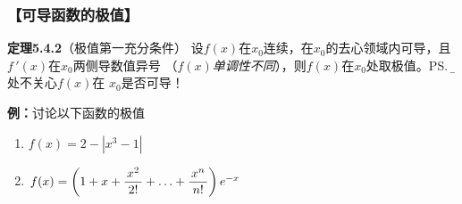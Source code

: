 \begin{center}
	\quad
\end{center}

\subsubsection{【可导函数的极值】}

{\bf 定理5.4.2}（极值第一充分条件）
设$f(x)$在$x_0$连续，在$x_0$的去心领域内可导，且$f\,'(x)$在$x_0$两侧导数值异号
（{\it $f(x)$单调性不同}），则$f(x)$在$x_0$处取极值。\ps{\b 此处不关心$f(x)$在
$x_0$是否可导！}

{\bf 例：}讨论以下函数的极值
\begin{enumerate}[(1)]
  \setlength{\itemindent}{1cm}
  \item $f(x)=2-|x^3-1|$
  \item $f(x)=\left(1+x+\displaystyle\frac{\,{x^2}\,}{\,{2!}\,}+\ldots+\displaystyle\frac{\,{x^n}\,}{\,{n!}\,}\right)e^{-x}$ 
\end{enumerate}

